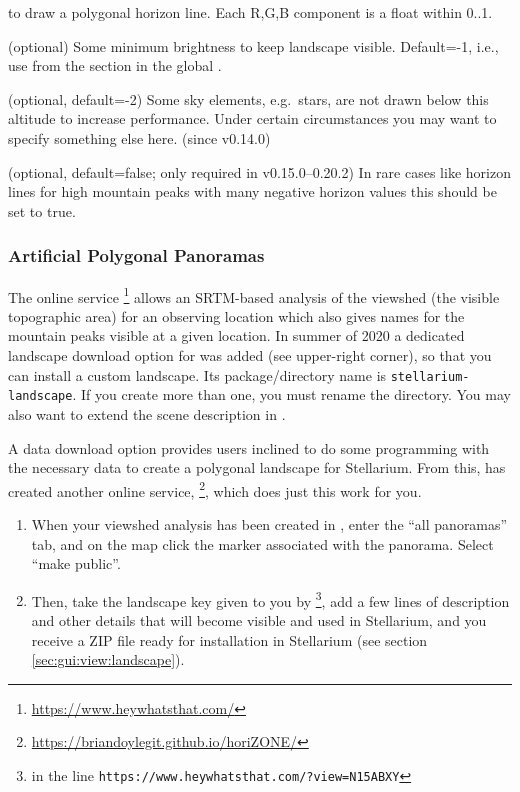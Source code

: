 \begin{description}
  to draw a polygonal horizon line. Each R,G,B component is a float
  within 0..1.
\item[\var{minimal\_brightness}] (optional) Some minimum brightness to
  keep landscape visible. Default=-1, i.e., use
   from the \var{[landscape]} section in the
  global .
\item[\var{minimal\_altitude}] (optional, default=-2) Some sky
  elements, e.g.\ stars, are not drawn below this altitude to increase
  performance. Under certain circumstances you may want to specify
  something else here. (since v0.14.0)
\item[\var{polygonal\_horizon\_inverted}] (optional, default=false;
  only required in v0.15.0--0.20.2) In rare cases like horizon lines
  for high mountain peaks with many negative horizon values this
  should be set to true.
\end{description}

\subsubsection{Artificial Polygonal Panoramas}
The online service
\footnote{\url{https://www.heywhatsthat.com/}}
allows an SRTM-based analysis of the viewshed (the visible topographic
area) for an observing location which also gives names for the
mountain peaks visible at a given location. In summer of 2020 a
dedicated landscape download option for  was added
(see upper-right corner), so that you can install a custom
landscape. Its package/directory name is
\texttt{stellarium-landscape}. If you create more than one, you must
rename the directory. You may also want to extend the scene
description in .

A data download option provides users inclined to do some programming
with the necessary data to create a polygonal landscape for
Stellarium. From this,  has created another online service,
\footnote{\url{https://briandoylegit.github.io/horiZONE/}},
which does just this work for you.
\begin{enumerate}
\item When your viewshed analysis has been created in
  , enter the ``all panoramas'' tab, and on the
  map click the marker associated with the panorama. Select ``make
  public''.
\item Then, take the landscape key given to you by
  \footnote{ in the line
    \texttt{https://www.heywhatsthat.com/?view=N15ABXY}}, add a few
  lines of description and other details that will become visible and
  used in Stellarium, and you receive a ZIP file ready for
  installation in Stellarium (see section
  \ref{sec:gui:view:landscape}).
\end{enumerate}



